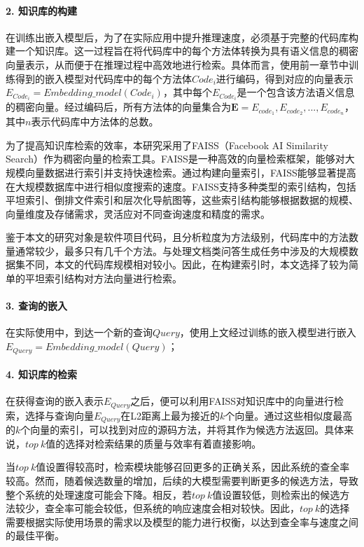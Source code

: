 \paragraph{2. 知识库的构建}

在训练出嵌入模型后，为了在实际应用中提升推理速度，必须基于完整的代码库构建一个知识库。这一过程旨在将代码库中的每个方法体转换为具有语义信息的稠密向量表示，从而便于在推理过程中高效地进行检索。具体而言，使用前一章节中训练得到的嵌入模型对代码库中的每个方法体$Code_i$进行编码，得到对应的向量表示$E_{Code_i}=Embedding\_model(Code_i)$，其中每个$E_{Code_i}$是一个包含该方法语义信息的稠密向量。经过编码后，所有方法体的向量集合为$\mathbf{E}={E_{code_1}, E_{code_2}, ..., E_{code_n}}$，其中$n$表示代码库中方法体的总数。

为了提高知识库检索的效率，本研究采用了FAISS（Facebook AI Similarity Search）作为稠密向量的检索工具。FAISS是一种高效的向量检索框架，能够对大规模向量数据进行索引并支持快速检索。通过构建向量索引，FAISS能够显著提高在大规模数据库中进行相似度搜索的速度。FAISS支持多种类型的索引结构，包括平坦索引、倒排文件索引和层次化导航图等，这些索引结构能够根据数据的规模、向量维度及存储需求，灵活应对不同查询速度和精度的需求。

鉴于本文的研究对象是软件项目代码，且分析粒度为方法级别，代码库中的方法数量通常较少，最多只有几千个方法。与处理文档类问答生成任务中涉及的大规模数据集不同，本文的代码库规模相对较小。因此，在构建索引时，本文选择了较为简单的平坦索引结构对方法向量进行检索。

\paragraph{3. 查询的嵌入}

在实际使用中，到达一个新的查询$Query$，使用上文经过训练的嵌入模型进行嵌入$E_{Query}=Embedding\_model(Query)$；

\paragraph{4. 知识库的检索}

在获得查询的嵌入表示$E_{Query}$之后，便可以利用FAISS对知识库中的向量进行检索，选择与查询向量$E_{Query}$在L2距离上最为接近的$k$个向量。通过这些相似度最高的$k$个向量的索引，可以找到对应的源码方法，并将其作为候选方法返回。具体来说，$top\ k$值的选择对检索结果的质量与效率有着直接影响。

当$top\ k$值设置得较高时，检索模块能够召回更多的正确关系，因此系统的查全率较高。然而，随着候选数量的增加，后续的大模型需要判断更多的候选方法，导致整个系统的处理速度可能会下降。相反，若$top\ k$值设置较低，则检索出的候选方法较少，查全率可能会较低，但系统的响应速度会相对较快。因此，$top\ k$的选择需要根据实际使用场景的需求以及模型的能力进行权衡，以达到查全率与速度之间的最佳平衡。



